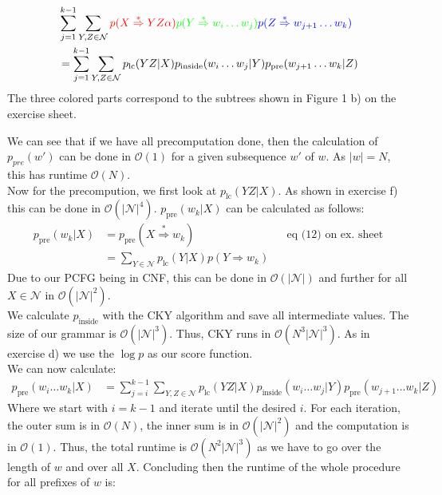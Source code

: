 \documentclass[a4paper,12pt]{ETHexercise}
\begin{document}
\begin{question}
\begin{subquestion}
\begin{align}
			                                                              & \sum_{j=1}^{k-1} \sum_{Y,Z \in \mathcal{N}} {\color{red} p(X \overset{*}{\Rightarrow} YZ\alpha)}{\color{green}p(Y \overset{*}{\Rightarrow} w_i \dots w_j)}{\color{blue} p(Z \overset{*}{\Rightarrow} w_{j+1} \dots w_k)}                  \\& =\sum_{j=1}^{k-1} \sum_{Y,Z \in \mathcal{N}}p_{\text{lc}}(YZ | X) p_{\text{inside}}(w_i \dots w_j | Y) p_{\text{pre}}(w_{j+1} \dots w_k | Z) \label{eq:pre5}                                                                               \\
		\end{align}
		The three colored parts correspond to the subtrees shown in Figure 1 b) on the exercise sheet.
	\end{subquestion}
	\begin{subquestion}
		We can see that if we have all precomputation done, then the calculation of $p_{pre}(w')$ can be done in $\mathcal{O}(1)$ for a given subsequence $w'$ of $w$. As $|w| = N$, this has runtime $\mathcal{O}(N)$.\\
		Now for the precompution, we first look at $p_{\text{lc}}(YZ | X)$. As shown in exercise f) this can be done in $\mathcal{O}(|\mathcal{N}|^4)$.
		$p_{\text{pre}}(w_k | X)$ can be calculated as follows:
		\begin{align}
			p_{\text{pre}}(w_k | X) & = p_{\text{pre}}(X \overset{*}{\Rightarrow} w_k)                  &  & \text{eq (12) on ex. sheet} \\
			                        & = \sum_{Y \in \mathcal{N}} p_{\text{lc}}(Y|X)p(Y \Rightarrow w_k)
		\end{align}
		Due to our PCFG being in CNF, this can be done in $\mathcal{O}(|\mathcal{N}|)$ and further for all $X \in \mathcal{N}$ in $\mathcal{O}(|\mathcal{N}|^2)$.\\
		We calculate $p_{\text{inside}}$ with the CKY algorithm and save all intermediate values. The size of our grammar is $\mathcal{O}(|\mathcal{N}|^3)$. Thus, CKY runs in $\mathcal{O}(N^3 |\mathcal{N}|^3)$. As in exercise d) we use the $\log p$ as our score function.\\
		We can now calculate:
		\begin{align}
			p_{\text{pre}}(w_{i} \dots w_k | X) & = \sum_{j=i}^{k-1} \sum_{Y,Z \in \mathcal{N}} p_{\text{lc}}(YZ | X) p_{\text{inside}}(w_i \dots w_j | Y) p_{\text{pre}}(w_{j+1} \dots w_k | Z)
		\end{align}
		Where we start with $i = k-1$ and iterate until the desired $i$. For each iteration, the outer sum is in $\mathcal{O}(N)$, the inner sum is in $\mathcal{O}(|\mathcal{N}|^2)$ and the computation is in $\mathcal{O}(1)$. Thus, the total runtime is $\mathcal{O}(N^2 |\mathcal{N}|^3)$ as we have to go over the length of $w$ and over all $X$. Concluding then the runtime of the whole procedure for all prefixes of $w$ is:

\end{subquestion}
\end{question}
\end{document}
